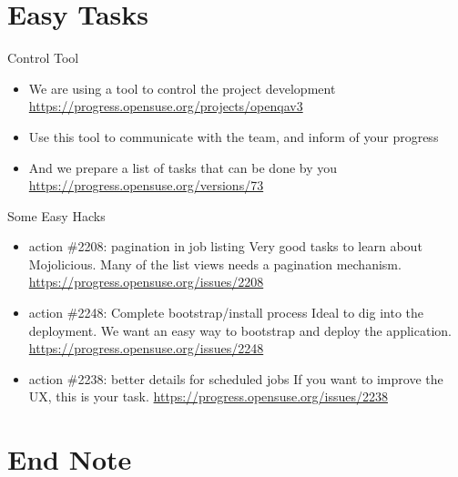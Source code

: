 \documentclass{beamer}
\begin{document}
\section{Easy Tasks}

\begin{frame}{Control Tool}
  \begin{itemize}
  \item We are using a tool to control the project development\newline
    {\small\url{https://progress.opensuse.org/projects/openqav3}}
  \item Use this tool to communicate with the team, and inform of your progress
  \item And we prepare a list of tasks that can be done by you\newline
    {\small\url{https://progress.opensuse.org/versions/73}}
  \end{itemize}
\end{frame}

\begin{frame}{Some Easy Hacks}
  \begin{itemize}
  \item action \#2208: pagination in job listing\newline
    Very good tasks to learn about Mojolicious. Many of the list views
    needs a pagination mechanism.\newline
    {\small\url{https://progress.opensuse.org/issues/2208}}
  \item action \#2248: Complete bootstrap/install process\newline
    Ideal to dig into the deployment. We want an easy way to bootstrap
    and deploy the application.\newline
    {\small\url{https://progress.opensuse.org/issues/2248}}
  \item action \#2238: better details for scheduled jobs\newline
    If you want to improve the UX, this is your task.\newline
    {\small\url{https://progress.opensuse.org/issues/2238}}
  \end{itemize}
\end{frame}


\section{End Note}
\end{document}
